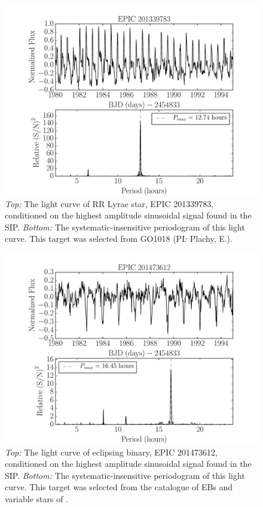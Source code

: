 \documentclass[useAMS, usenatbib, preprint, 12pt]{aastex}
\begin{document}
\begin{figure}
\begin{center}
\includegraphics[width=6in, clip=true]{RR_201339783.pdf}
\caption{{\it Top:} The light curve of RR Lyrae star, EPIC 201339783,
	conditioned on the highest amplitude sinusoidal signal found in the
	SIP. {\it Bottom:} The systematic-insensitive periodogram of
	this light curve. This target was selected from GO1018
	(PI: Plachy, E.).}
\label{fig:RRLyrae}
\end{center}
\end{figure}

\begin{figure}
\begin{center}
\includegraphics[width=6in, clip=true]{EB_201473612.pdf}
\caption{{\it Top:} The light curve of eclipsing binary, EPIC 201473612,
	conditioned on the highest amplitude sinusoidal signal found in the
	SIP. {\it Bottom:} The systematic-insensitive periodogram of
	this light curve. This target was selected from the catalogue of EBs
	and variable stars of \citet{Armstrong2015}.}
\label{fig:EB}
\end{center}
\end{figure}
\end{document}
